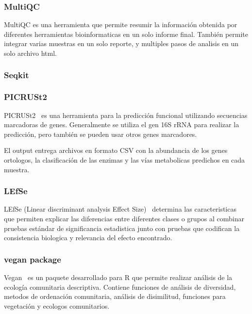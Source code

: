 \subsubsection{MultiQC}
MultiQC \cite{ewels2016multiqc} es una herramienta que permite resumir la información obtenida por diferentes herramientas bioinformaticas en un solo informe final. También permite integrar varias muestras en un solo reporte, y multiples pasos de analisis en un solo archivo html.


\subsubsection{Seqkit}

\subsubsection{PICRUSt2}
PICRUSt2~\cite{douglas2020picrust2} es una herramienta para la predicción funcional utilizando secuencias marcadoras de genes.
Generalmente se utiliza el gen 16S rRNA para realizar la predicción, pero también se pueden usar otros genes marcadores.

El output entrega archivos en formato CSV con la abundancia de los genes ortologos, la clasificación de las enzimas y las vías metabolicas predichos en cada muestra.

\subsubsection{LEfSe}
LEfSe (Linear discriminant analysis Effect Size)~\cite{segata2011metagenomic}  determina las caracteristicas que permiten explicar las diferencias entre diferentes clases o grupos al combinar pruebas estándar de significancia estadistica junto con pruebas que codifican la consistencia biologica y relevancia del efecto encontrado. 
\subsubsection{vegan package}
Vegan~\cite{dixon2003vegan} es un paquete desarrollado para R que permite realizar análisis de la ecología comunitaria descriptiva. Contiene funciones de análisis de diversidad,  metodos de ordenación comunitaria, análisis de disimilitud, funciones para vegetación y ecologos comunitarios.

